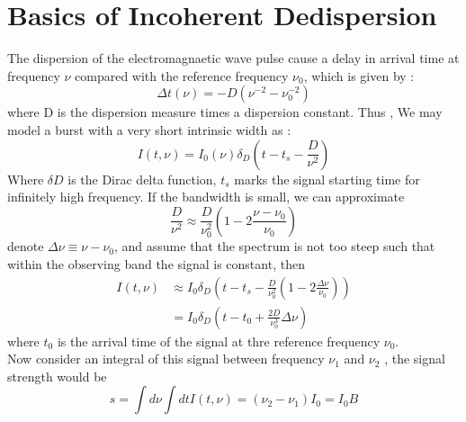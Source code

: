 \documentclass[twocolumn]{aastex61}
\begin{document}



\section{Basics of Incoherent Dedispersion}
\label{sec:obs}

The dispersion of the electromagnaetic wave pulse cause a delay in arrival time at frequency $\nu$ compared with the reference frequency $\nu_0$, which is given by :
\begin{equation}
\Delta t (\nu) = -D(\nu^{-2} -\nu^{-2}_{0})\label{eq:1}
\end{equation}
where D is the dispersion measure times a dispersion constant. Thus , We may model a burst with a very short intrinsic width as :
\begin{equation}
I(t,\nu)=I_0(\nu)\delta_D(t-t_s -\frac{D}{\nu^2})  
\end{equation}
Where $\delta D$ is the Dirac delta function, $t_s$ marks the signal starting time for infinitely high frequency. If the bandwidth is small, we can approximate
\begin{equation*}
\frac{D}{\nu^{2}}\approx\frac{D}{\nu_0^2}(1-2\frac{\nu-\nu_0}{\nu_0})
\end{equation*}
denote $\Delta　\nu \equiv \nu - \nu_0$, and assume that the spectrum is not too steep such that within the observing band the signal is constant, then
\begin{equation}
\begin{aligned}
I(t,\nu) & \approx I_0\delta_D(t-t_s-\frac{D}{\nu_0^2}(1-2\frac{\Delta\nu}{\nu_0}) ) \\
		 & = I_0\delta_D(t -t_0 +\frac{2D}{\nu_0^3}\Delta\nu)
\end{aligned} 
\end{equation}
where $t_0$ is the arrival time of the signal at thre reference frequency $\nu_0$. \\
	Now consider an integral of this signal between frequency $\nu_1 $ and $\nu_2$ , the signal strength would be
\begin{equation}
s = \int d \nu \int dtI(t,\nu)=(\nu_2 -\nu_1)I_0 = I_0B
\end{equation}
\end{document}
